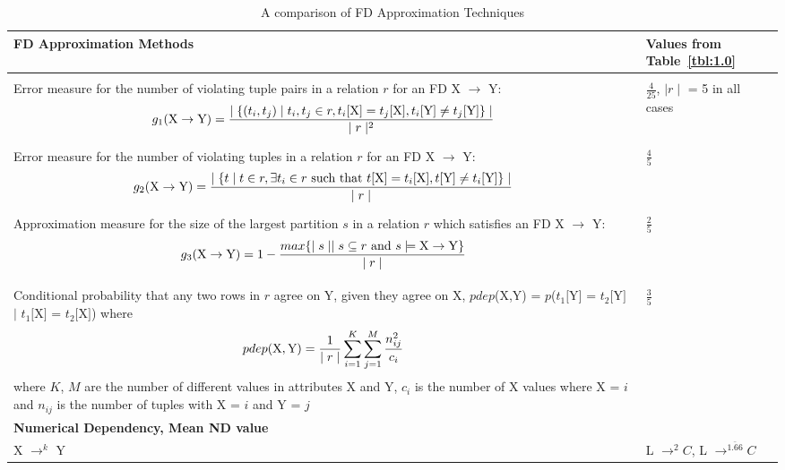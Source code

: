 {\line
\begin{table}[ht]
\begin{center}
{\footnotesize
\begin{tabular}{|p{31em}|p{10em}|} \hline 
{\bf FD Approximation Methods }  & {\bf Values from Table~\ref{tbl:1.0}}\\ \hline
\multicolumn{2}{|p{41em}|}{\bf \cite{km95} } \\ \hline
Error measure for the number of violating tuple pairs in a relation
$r$ for an FD X $\to$ Y:
\[
g_1({\rm X} \to {\rm Y}) = \frac{\mid \{ (t_i,t_j) \mid t_i,t_j \in r, t_i[{\rm X}] =
t_j[{\rm X}], t_i[{\rm Y}] \not= t_j[{\rm Y}] \}\mid} {\mid r \mid^2}
\] & $\frac{4}{25}$, $\mid r \mid$ = 5 in all cases\\ \hline 
Error measure for the number of violating tuples in a relation
$r$ for an FD X $\to$ Y:
\[
g_2({\rm X} \to {\rm Y}) = \frac{\mid \{ t \mid t\in r, \exists t_i
\in r \mbox{ such that }  t[{\rm X}] =
t_i[{\rm X}], t[{\rm Y}] \not= t_i[{\rm Y}]  \} \mid} {\mid r \mid}
\] & $\frac{4}{5}$ \\ \hline 
Approximation measure for the size of the largest partition $s$ in a relation
$r$ which satisfies an FD X $\to$ Y:
\[
g_3({\rm X} \to {\rm Y}) = 1 - \frac{max \{ \mid s \mid \mid s \subseteq r
\mbox{ and }  s \models {\rm X} \to {\rm Y} \}}{\mid r \mid}
\] & $\frac{2}{5}$  \\ \hline

\multicolumn{2}{|p{41em}|}{\bf \cite{psm93} } \\ \hline
Conditional probability that any two rows in $r$ agree on Y, given
they agree on  
X, $pdep$(X,Y) = $p$($t_1[$Y$]$ = $t_2[$Y$]$ $\mid$ $t_1[$X$]$ =
$t_2[$X$]$) where \[ pdep({\rm X},{\rm Y}) = \frac{1}{\mid r \mid}
\sum_{i=1}^K\sum_{j=1}^M \frac{n_{ij}^2}{c_i} \]  where $K$, $M$ are
the number of different values in attributes X and Y, $c_i$ is the
number of X values where X = $i$ and $n_{ij}$ is
the number of tuples with X = $i$ and Y = $j$ & $\frac{3}{5}$  \\ \hline
\multicolumn{2}{|p{41em}|}{\bf Numerical Dependency, Mean ND value } \\ \hline
 X $\to^k$ Y   & L $\to^2 C$, L $\to^{\bar{1.66}} C$  \\ \hline
\end{tabular}
}
\end{center}
\caption{\label{tbl:fd_approx} A comparison of FD Approximation Techniques }
\end{table}
}


